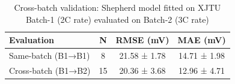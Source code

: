 \begin{table}[htbp]
\centering
\caption{Cross-batch validation: Shepherd model fitted on XJTU Batch-1 (2C rate) evaluated on Batch-2 (3C rate)}
\label{tab:cross_batch}
\begin{tabular}{lccc}
\hline
Evaluation & N & RMSE (mV) & MAE (mV) \\
\hline
Same-batch (B1→B1) & 8 & 21.58 ± 1.78 & 14.71 ± 1.98 \\
Cross-batch (B1→B2) & 15 & 20.36 ± 3.68 & 12.96 ± 4.71 \\
\hline
\end{tabular}
\end{table}
